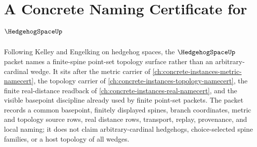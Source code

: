 \chapter{A Concrete Naming Certificate for $\HedgehogSpaceUp$}
\label{ch:concrete-instances-hedgehog-space-namecert}

Following Kelley and Engelking on hedgehog spaces, the $\HedgehogSpaceUp$
packet names a finite-spine point-set topology surface rather than an
arbitrary-cardinal wedge. It sits after the metric carrier of
\autoref{ch:concrete-instances-metric-namecert}, the topology carrier of
\autoref{ch:concrete-instances-topology-namecert}, the finite real-distance
readback of \autoref{ch:concrete-instances-real-namecert}, and the visible
basepoint discipline already used by finite point-set packets. The
packet records a common basepoint, finitely displayed spines, branch
coordinates, metric and topology source rows, real distance rows, transport,
replay, provenance, and local naming; it does not claim arbitrary-cardinal
hedgehogs, choice-selected spine families, or a host topology of all wedges.

